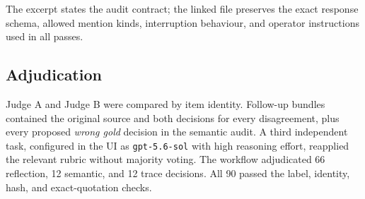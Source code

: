 \documentclass[conference]{IEEEtran}
\begin{document}
The excerpt states the audit contract; the linked file preserves the exact response schema, allowed mention kinds, interruption behaviour, and operator instructions used in all passes.
\subsection{Adjudication}

Judge A and Judge B were compared by item identity. Follow-up bundles contained
the original source and both decisions for every disagreement, plus every proposed
\emph{wrong gold} decision in the semantic audit. A third independent task,
configured in the UI as \texttt{gpt-5.6-sol} with high reasoning effort,
reapplied the relevant rubric without majority voting. The workflow adjudicated
66 reflection, 12 semantic, and 12 trace decisions. All 90 passed the label,
identity, hash, and exact-quotation checks.
\end{document}
